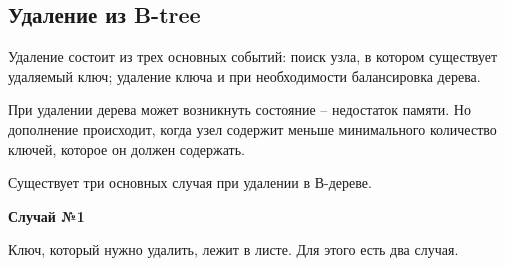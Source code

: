         \subsection{Удаление из B-tree}
        Удаление состоит из трех основных событий: поиск узла, в котором существует удаляемый ключ; удаление ключа и при необходимости балансировка дерева. \par
        При удалении дерева может возникнуть состояние – недостаток памяти. Но дополнение происходит, когда узел содержит меньше минимального количество ключей, которое он должен содержать. \par
        Существует три основных случая при удалении в В-дереве. \par
        \textbf{Случай №1} \par
        Ключ, который нужно удалить, лежит в листе. Для этого есть два случая. \par
